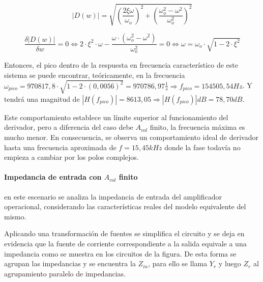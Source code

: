 \begin{equation*}
	|D(w)| = \sqrt{\left( \frac{2 \xi \omega}{\omega_o} \right)^{2} + \left( \frac{\omega_o^{2} - \omega^{2}}{\omega_o^{2}} \right)^{2}}
\end{equation*}

\begin{equation}
	\frac{\delta |D(w)|}{\delta w}
	= 0 \Leftrightarrow 2 \cdot \xi^{2} \cdot \omega - \frac{\omega \cdot (\omega_o^{2} - \omega^{2})}{\omega_o^{2}} = 0
	\Leftrightarrow
	\omega = \omega_o \cdot \sqrt{1 - 2 \cdot \xi^{2}}
\end{equation}

Entonces, el pico dentro de la respuesta en frecuencia caracter\'istico de este sistema se puede encontrar, te\'oricamente, en la frecuencia $\omega_{pico} = 970817,8 \cdot \sqrt{1- 2 \cdot (0,0056)^{2}} = 970786,97 \frac{1}{s} \Rightarrow f_{pico} = 154505,54Hz$. Y tendr\'a una magnitud de $|H(f_{pico})| = 8613,05 \Rightarrow |H(f_{pico})|dB = 78,70dB$.

Este comportamiento establece un l\'imite superior al funcionamiento del derivador, pero a diferencia del caso debe
$A_{vol}$ finito, la frecuencia m\'axima es mucho menor. En consecuencia, se observa un comportamiento ideal de derivador hasta
una frecuencia aproximada de $f = 15,45kHz$ donde la fase todav\'ia no empieza a cambiar por los polos complejos.


\paragraph*{Impedancia de entrada con $A_{vol}$ finito} en este escenario se analiza la impedancia de entrada del amplificador operacional, considerando las caracter\'isticas reales del modelo equivalente del mismo.

Aplicando una transformaci\'on de fuentes se simplifica el circuito y se deja en evidencia que la fuente de corriente correspondiente a la salida equivale a una impedancia como se muestra en los circuitos de la figura. %
De esta forma se agrupan las impedancias y se encuentra la $Z_{in}$, para ello se llama $Y_r$ y luego $Z_r$ al agrupamiento paralelo de impedancias.

